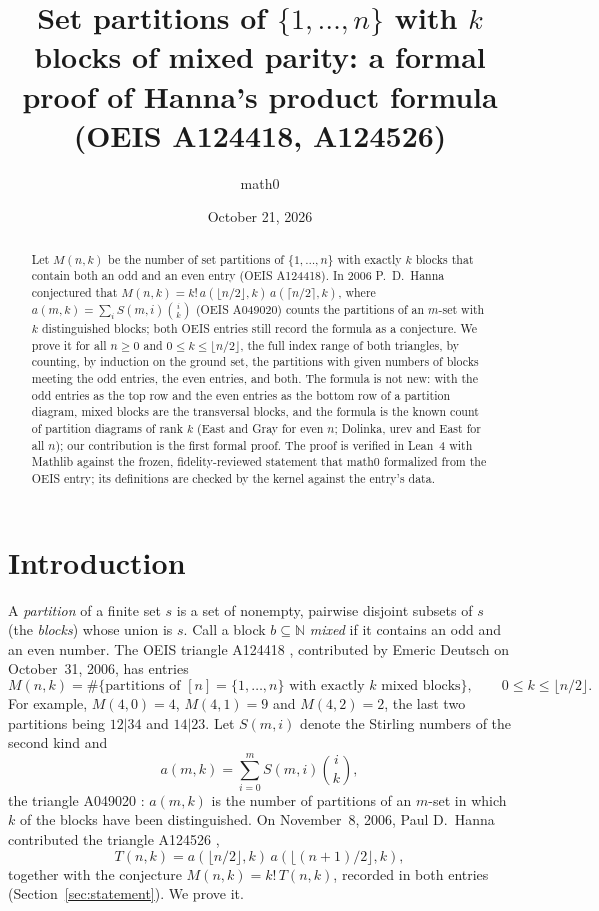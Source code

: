 \documentclass[11pt]{amsart}
\title[Partitions with $k$ blocks of mixed parity]{Set partitions of $\{1,\dots,n\}$ with $k$ blocks of mixed parity: a formal proof of Hanna's product formula (OEIS A124418, A124526)}
\author{math0}
\date{October 21, 2026}
\theoremstyle{plain}
\theoremstyle{definition}
\newcommand{\N}{\mathbb{N}}
\begin{document}
\begin{abstract}
Let $M(n,k)$ be the number of set partitions of $\{1,\dots,n\}$ with exactly $k$ blocks that contain both an odd and an even entry (OEIS A124418).
In 2006 P.~D.~Hanna conjectured that $M(n,k)=k!\,a(\lfloor n/2\rfloor,k)\,a(\lceil n/2\rceil,k)$, where $a(m,k)=\sum_i S(m,i)\binom ik$ (OEIS A049020) counts the partitions of an $m$-set with $k$ distinguished blocks; both OEIS entries still record the formula as a conjecture.
We prove it for all $n\ge0$ and $0\le k\le\lfloor n/2\rfloor$, the full index range of both triangles, by counting, by induction on the ground set, the partitions with given numbers of blocks meeting the odd entries, the even entries, and both.
The formula is not new: with the odd entries as the top row and the even entries as the bottom row of a partition diagram, mixed blocks are the transversal blocks, and the formula is the known count of partition diagrams of rank $k$ (East and Gray for even $n$; Dolinka, \DJ ur\dj ev and East for all $n$); our contribution is the first formal proof.
The proof is verified in Lean~4 with Mathlib against the frozen, fidelity-reviewed statement that math0 formalized from the OEIS entry; its definitions are checked by the kernel against the entry's data.
\end{abstract}
\maketitle

\section{Introduction}

A \emph{partition} of a finite set $s$ is a set of nonempty, pairwise disjoint subsets of $s$ (the \emph{blocks}) whose union is $s$.
Call a block $b\subseteq\N$ \emph{mixed} if it contains an odd and an even number.
The OEIS triangle A124418 \cite{A124418}, contributed by Emeric Deutsch on October~31, 2006, has entries
\[
  M(n,k)=\#\{\text{partitions of }[n]=\{1,\dots,n\}\text{ with exactly $k$ mixed blocks}\},\qquad 0\le k\le\lfloor n/2\rfloor .
\]
For example, $M(4,0)=4$, $M(4,1)=9$ and $M(4,2)=2$, the last two partitions being $12|34$ and $14|23$.
Let $S(m,i)$ denote the Stirling numbers of the second kind and
\[
  a(m,k)=\sum_{i=0}^{m}S(m,i)\binom ik ,
\]
the triangle A049020 \cite{A049020}: $a(m,k)$ is the number of partitions of an $m$-set in which $k$ of the blocks have been distinguished.
On November~8, 2006, Paul D.~Hanna contributed the triangle A124526 \cite{A124526},
\[
  T(n,k)=a(\lfloor n/2\rfloor,k)\,a(\lfloor (n+1)/2\rfloor,k),
\]
together with the conjecture $M(n,k)=k!\,T(n,k)$, recorded in both entries (Section~\ref{sec:statement}).
We prove it.
\end{document}
